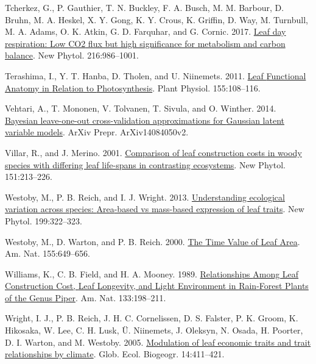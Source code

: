 \documentclass[
  12pt,
]{article}
\newlength{\cslhangindent}
\newlength{\cslentryspacingunit} %
\newenvironment{CSLReferences}[2] %
 {%
  \setlength{\parindent}{0pt}
  \ifodd #1
  \let\oldpar\par
  \def\par{\hangindent=\cslhangindent\oldpar}
  \fi
  \setlength{\parskip}{#2\cslentryspacingunit}
 }%
 {}
\begin{document}
\begin{CSLReferences}{1}{0}
\leavevmode{}%
Tcherkez, G., P. Gauthier, T. N. Buckley, F. A. Busch, M. M. Barbour, D. Bruhn, M. A. Heskel, X. Y. Gong, K. Y. Crous, K. Griffin, D. Way, M. Turnbull, M. A. Adams, O. K. Atkin, G. D. Farquhar, and G. Cornic. 2017. \href{https://doi.org/10.1111/nph.14816}{Leaf day respiration: Low {CO2} flux but high significance for metabolism and carbon balance}. New Phytol. 216:986--1001.

\leavevmode{}%
Terashima, I., Y. T. Hanba, D. Tholen, and U. Niinemets. 2011. \href{https://doi.org/10.1104/pp.110.165472}{Leaf {Functional Anatomy} in {Relation} to {Photosynthesis}}. Plant Physiol. 155:108--116.

\leavevmode{}%
Vehtari, A., T. Mononen, V. Tolvanen, T. Sivula, and O. Winther. 2014. \href{https://arxiv.org/abs/1408.4050v2}{Bayesian leave-one-out cross-validation approximations for {Gaussian} latent variable models}. ArXiv Prepr. ArXiv14084050v2.

\leavevmode{}%
Villar, R., and J. Merino. 2001. \href{https://doi.org/10.1046/j.1469-8137.2001.00147.x}{Comparison of leaf construction costs in woody species with differing leaf life-spans in contrasting ecosystems}. New Phytol. 151:213--226.

\leavevmode{}%
Westoby, M., P. B. Reich, and I. J. Wright. 2013. \href{https://doi.org/10.1111/nph.12345}{Understanding ecological variation across species: {Area}-based vs mass-based expression of leaf traits}. New Phytol. 199:322--323.

\leavevmode{}%
Westoby, M., D. Warton, and P. B. Reich. 2000. \href{https://doi.org/10.1086/303346}{The {Time Value} of {Leaf Area}}. Am. Nat. 155:649--656.

\leavevmode{}%
Williams, K., C. B. Field, and H. A. Mooney. 1989. \href{https://doi.org/10.1086/284910}{Relationships {Among Leaf Construction Cost}, {Leaf Longevity}, and {Light Environment} in {Rain}-{Forest Plants} of the {Genus Piper}}. Am. Nat. 133:198--211.

\leavevmode{}%
Wright, I. J., P. B. Reich, J. H. C. Cornelissen, D. S. Falster, P. K. Groom, K. Hikosaka, W. Lee, C. H. Lusk, Ü. Niinemets, J. Oleksyn, N. Osada, H. Poorter, D. I. Warton, and M. Westoby. 2005. \href{https://doi.org/10.1111/j.1466-822x.2005.00172.x}{Modulation of leaf economic traits and trait relationships by climate}. Glob. Ecol. Biogeogr. 14:411--421.


\end{CSLReferences}
\end{document}
